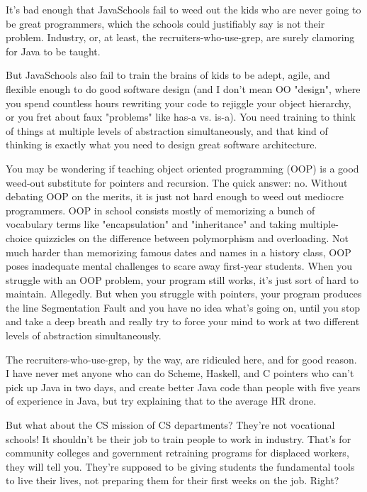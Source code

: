 \documentclass[11pt]{article}
\begin{document}
It's bad enough that JavaSchools fail to weed out the kids who are never going
to be great programmers, which the schools could justifiably say is not their
problem. Industry, or, at least, the recruiters-who-use-grep, are surely
clamoring for Java to be taught.

But JavaSchools also fail to train the brains of kids to be adept, agile, and
flexible enough to do good software design (and I don't mean OO "design", where
you spend countless hours rewriting your code to rejiggle your object hierarchy,
or you fret about faux "problems" like has-a vs. is-a). You need training to
think of things at multiple levels of abstraction simultaneously, and that kind
of thinking is exactly what you need to design great software architecture.

You may be wondering if teaching object oriented programming (OOP) is a good
weed-out substitute for pointers and recursion. The quick answer: no. Without
debating OOP on the merits, it is just not hard enough to weed out mediocre
programmers. OOP in school consists mostly of memorizing a bunch of vocabulary
terms like "encapsulation" and "inheritance" and taking multiple-choice
quizzicles on the difference between polymorphism and overloading. Not much
harder than memorizing famous dates and names in a history class, OOP poses
inadequate mental challenges to scare away first-year students. When you
struggle with an OOP problem, your program still works, it's just sort of hard
to maintain. Allegedly. But when you struggle with pointers, your program
produces the line Segmentation Fault and you have no idea what's going on, until
you stop and take a deep breath and really try to force your mind to work at two
different levels of abstraction simultaneously.

The recruiters-who-use-grep, by the way, are ridiculed here, and for good
reason. I have never met anyone who can do Scheme, Haskell, and C pointers who
can't pick up Java in two days, and create better Java code than people with
five years of experience in Java, but try explaining that to the average HR
drone.

But what about the CS mission of CS departments? They're not vocational schools!
It shouldn't be their job to train people to work in industry. That's for
community colleges and government retraining programs for displaced workers,
they will tell you. They're supposed to be giving students the fundamental tools
to live their lives, not preparing them for their first weeks on the job. Right?
\end{document}
